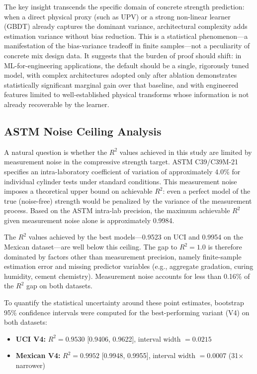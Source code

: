 \documentclass[journal]{IEEEtran}
\begin{document}
The key insight transcends the specific domain of concrete strength prediction: when a direct physical proxy (such as UPV) or a strong non-linear learner (GBDT) already captures the dominant variance, architectural complexity adds estimation variance without bias reduction. This is a statistical phenomenon---a manifestation of the bias-variance tradeoff in finite samples---not a peculiarity of concrete mix design data. It suggests that the burden of proof should shift: in ML-for-engineering applications, the default should be a single, rigorously tuned model, with complex architectures adopted only after ablation demonstrates statistically significant marginal gain over that baseline, and with engineered features limited to well-established physical transforms whose information is not already recoverable by the learner.

\subsection{ASTM Noise Ceiling Analysis}

A natural question is whether the $R^2$ values achieved in this study are limited by measurement noise in the compressive strength target. ASTM C39/C39M-21 \cite{astm2021c39} specifies an intra-laboratory coefficient of variation of approximately 4.0\% for individual cylinder tests under standard conditions. This measurement noise imposes a theoretical upper bound on achievable $R^2$: even a perfect model of the true (noise-free) strength would be penalized by the variance of the measurement process. Based on the ASTM intra-lab precision, the maximum achievable $R^2$ given measurement noise alone is approximately 0.9984.

The $R^2$ values achieved by the best models---0.9523 on UCI and 0.9954 on the Mexican dataset---are well below this ceiling. The gap to $R^2 = 1.0$ is therefore dominated by factors other than measurement precision, namely finite-sample estimation error and missing predictor variables (e.g., aggregate gradation, curing humidity, cement chemistry). Measurement noise accounts for less than 0.16\% of the $R^2$ gap on both datasets.

To quantify the statistical uncertainty around these point estimates, bootstrap 95\% confidence intervals were computed for the best-performing variant (V4) on both datasets:

\begin{itemize}
\item \textbf{UCI V4:} $R^2 = 0.9530$ [0.9406, 0.9622], interval width $= 0.0215$
\item \textbf{Mexican V4:} $R^2 = 0.9952$ [0.9948, 0.9955], interval width $= 0.0007$ (31$\times$ narrower)
\end{itemize}
\end{document}
